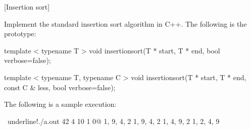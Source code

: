 [Insertion sort]

Implement the standard insertion sort algorithm in C++.
The following is the prototype:
\begin{console}[frame=single, fontsize=\footnotesize]
template < typename T >
void insertionsort(T * start, T * end, bool verbose=false);

template < typename T, typename C >
void insertionsort(T * start, T * end, const C & less, bool verbose=false);
\end{console}

The following is a sample execution:
\begin{console}[frame=single, commandchars=\~\!\@,fontsize=\footnotesize]
~underline!./a.out 42 4 10 1 0@
{1, 9, 4, 2}
{1, 9, 4, 2}
{1, 4, 9, 2}
{1, 2, 4, 9}
\end{console}

